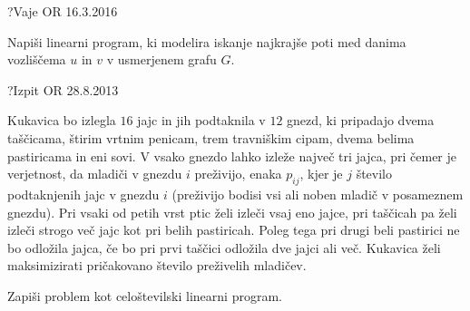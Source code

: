 \begin{naloga}{?}{Vaje OR 16.3.2016}
\begin{vprasanje}
Napiši linearni program,
ki modelira iskanje najkrajše poti
med danima vozliščema $u$ in $v$ v usmerjenem grafu $G$.
\end{vprasanje}
\begin{odgovor}
\end{odgovor}
\end{naloga}


\begin{naloga}{?}{Izpit OR 28.8.2013}
\begin{vprasanje}
Kukavica bo izlegla $16$ jajc in jih podtaknila v $12$ gnezd,
ki pripadajo dvema taščicama, štirim vrtnim penicam, trem travniškim cipam,
dvema belima pastiricama in eni sovi.
V vsako gnezdo lahko izleže največ tri jajca,
pri čemer je verjetnost, da mladiči v gnezdu $i$ preživijo,
enaka $p_{ij}$, kjer je $j$ število podtaknjenih jajc v gnezdu $i$
(preživijo bodisi vsi ali noben mladič v posameznem gnezdu).
Pri vsaki od petih vrst ptic želi izleči vsaj eno jajce,
pri taščicah pa želi izleči strogo več jajc kot pri belih pastiricah.
Poleg tega pri drugi beli pastirici ne bo odložila jajca,
če bo pri prvi taščici odložila dve jajci ali več.
Kukavica želi maksimizirati pričakovano število preživelih mladičev.

Zapiši problem kot celoštevilski linearni program.
\end{vprasanje}
\begin{odgovor}
\end{odgovor}
\end{naloga}



